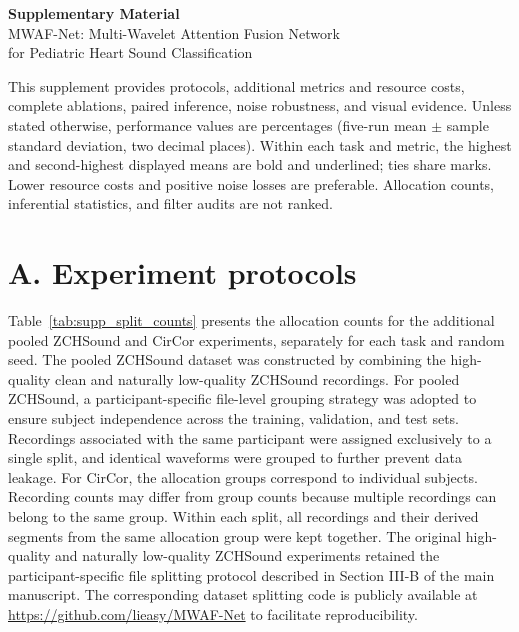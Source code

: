 \color{black}

\begin{center}
{\Large\bfseries Supplementary Material}\\[5pt]
{\large MWAF-Net: Multi-Wavelet Attention Fusion Network\\for Pediatric Heart Sound Classification}
\end{center}
This supplement provides protocols, additional metrics and resource costs, complete ablations, paired inference, noise robustness, and visual evidence. Unless stated otherwise, performance values are percentages (five-run mean $\pm$ sample standard deviation, two decimal places). Within each task and metric, the highest and second-highest displayed means are bold and underlined; ties share marks. Lower resource costs and positive noise losses are preferable. Allocation counts, inferential statistics, and filter audits are not ranked.

\section*{A. Experiment protocols}
Table~\ref{tab:supp_split_counts} presents the allocation counts for the additional pooled ZCHSound and CirCor experiments, separately for each task and random seed. The pooled ZCHSound dataset was constructed by combining the high-quality clean and naturally low-quality ZCHSound recordings. For pooled ZCHSound, a participant-specific file-level grouping strategy was adopted to ensure subject independence across the training, validation, and test sets. Recordings associated with the same participant were assigned exclusively to a single split, and identical waveforms were grouped to further prevent data leakage. For CirCor, the allocation groups correspond to individual subjects. Recording counts may differ from group counts because multiple recordings can belong to the same group. Within each split, all recordings and their derived segments from the same allocation group were kept together. The original high-quality and naturally low-quality ZCHSound experiments retained the participant-specific file splitting protocol described in Section III-B of the main manuscript. The corresponding dataset splitting code is publicly available at \url{https://github.com/lieasy/MWAF-Net} to facilitate reproducibility.

